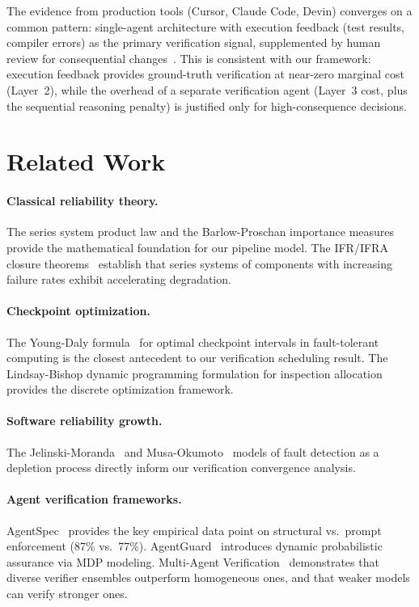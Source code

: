 \documentclass[11pt, a4paper, copyright]{googledeepmind}
\begin{document}
The evidence from production tools (Cursor, Claude Code, Devin) converges on a common pattern: single-agent architecture with execution feedback (test results, compiler errors) as the primary verification signal, supplemented by human review for consequential changes~\citep{cognition2025devin, metr2025devproductivity}.
This is consistent with our framework: execution feedback provides ground-truth verification at near-zero marginal cost (Layer~2), while the overhead of a separate verification agent (Layer~3 cost, plus the sequential reasoning penalty) is justified only for high-consequence decisions.

\section{Related Work}
\label{sec:related}

\paragraph{Classical reliability theory.}
The series system product law and the Barlow-Proschan importance measures~\citep{barlow1965mathematical, barlow1975statistical} provide the mathematical foundation for our pipeline model.
The IFR/IFRA closure theorems~\citep{birnbaum1961stochastic} establish that series systems of components with increasing failure rates exhibit accelerating degradation.

\paragraph{Checkpoint optimization.}
The Young-Daly formula~\citep{young1974first, daly2006higher} for optimal checkpoint intervals in fault-tolerant computing is the closest antecedent to our verification scheduling result.
The Lindsay-Bishop dynamic programming formulation for inspection allocation~\citep{lindsay1964allocation} provides the discrete optimization framework.

\paragraph{Software reliability growth.}
The Jelinski-Moranda~\citep{jelinski1972software} and Musa-Okumoto~\citep{musa1984logarithmic} models of fault detection as a depletion process directly inform our verification convergence analysis.

\paragraph{Agent verification frameworks.}
AgentSpec~\citep{wang2026agentspec} provides the key empirical data point on structural vs.\ prompt enforcement (87\% vs.\ 77\%).
AgentGuard~\citep{koohestani2025agentguard} introduces dynamic probabilistic assurance via MDP modeling.
Multi-Agent Verification~\citep{lifshitz2025mav} demonstrates that diverse verifier ensembles outperform homogeneous ones, and that weaker models can verify stronger ones.
\end{document}
